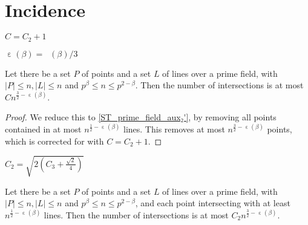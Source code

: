 \chapter{Incidence}
\label{chap:inc}

\DeclareMathOperator{\stpfone}{\varepsilon}
\DeclareMathOperator{\stpftwo}{\varepsilon_2}
\DeclareMathOperator{\sgone}{\varepsilon'}
\DeclareMathOperator{\sgtwo}{\varepsilon'_2}

\begin{definition}
    \label{ST_C}
    \leanok
    $C = C_2 + 1$
\end{definition}

\begin{definition}
    \leanok
    $\stpfone(\beta) = \stpftwo(\beta) / 3$
\end{definition}

\begin{theorem}
    \label{ST_prime_field}
    \leanok
    Let there be a set $P$ of points and a set $L$ of lines over a prime field, 
    with $|P| \leq n, |L| \leq n$ and $p^\beta \leq n \leq p^{2 - \beta}$.
    Then the number of intersections is at most $ C n^{\frac32 - \stpfone(\beta)} $.
\end{theorem}

\begin{proof}
    \leanok
    We reduce this to \ref{ST_prime_field_aux₂'}, by removing all points contained in at most
    $n^{\frac12 - \stpfone(\beta)}$ lines. This removes at most $n^{\frac32 - \stpfone(\beta)}$
    points, which is corrected for with $C = C_2 + 1$.
\end{proof}

\begin{definition}
    \label{ST_C2}
    \leanok
    $C_2 = \sqrt{2(C_3 + \frac{\sqrt2}4)}$
\end{definition}

\begin{theorem}
    \label{ST_prime_field_aux₂'}
    \leanok
    Let there be a set $P$ of points and a set $L$ of lines over a prime field, 
    with $|P| \leq n, |L| \leq n$ and $p^\beta \leq n \leq p^{2 - \beta}$,
    and each point intersecting with at least $n^{\frac12 - \stpfone(\beta)}$ lines.
    Then the number of intersections is at most $C_2 n^{\frac32 - \stpfone(\beta)}$.
\end{theorem}

